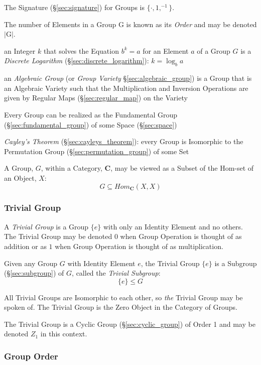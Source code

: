 The Signature (\S\ref{sec:signature}) for Groups is $\{\cdot, 1,
^{-1}\}$.

The number of Elements in a Group $\mathrm{G}$ is known as its
\emph{Order} and may be denoted $|\mathrm{G}|$.

an Integer $k$ that solves the Equation $b^k = a$ for an Element $a$ of a Group
$G$ is a \emph{Discrete Logarithm} (\S\ref{sec:discrete_logarithm}): $k =
\log_b a$

an \emph{Algebraic Group} (or \emph{Group Variety} \S\ref{sec:algebraic_group})
is a Group that is an Algebraic Variety such that the Multiplication and
Inversion Operations are given by Regular Maps (\S\ref{sec:regular_map}) on the
Variety

Every Group can be realized as the Fundamental Group
(\S\ref{sec:fundamental_group}) of some Space (\S\ref{sec:space})

\emph{Cayley's Theorem} (\S\ref{sec:cayleys_theorem}): every Group is
Isomorphic to the Permutation Group (\S\ref{sec:permutation_group}) of
some Set

A Group, $G$, within a Category, $\mathbf{C}$, may be viewed as a
Subset of the Hom-set of an Object, $X$:
\[
    G \subseteq Hom_{\mathbf{C}}(X,X)
\]



\subsubsection{Trivial Group}\label{sec:trivial_group}

A \emph{Trivial Group} is a Group $\{e\}$ with only an Identity
Element and no others. The Trivial Group may be denoted $0$ when
Group Operation is thought of as addition or as $1$ when Group
Operation is thought of as multiplication.

Given any Group $G$ with Identity Element $e$, the Trivial Group
$\{e\}$ is a Subgroup (\S\ref{sec:subgroup}) of $G$, called the
\emph{Trivial Subgroup}:
\[
    \{e\} \leq G
\]

All Trivial Groups are Isomorphic to each other, so \emph{the} Trivial
Group may be spoken of. The Trivial Group is the Zero Object in the
Category of Groups.

The Trivial Group is a Cyclic Group (\S\ref{sec:cyclic_group}) of
Order 1 and may be denoted $Z_1$ in this context.



\subsubsection{Group Order}\label{sec:group_order}

